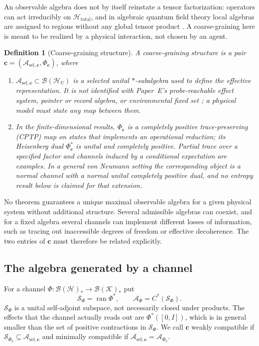 \documentclass[12pt,a4paper]{article}
\newtheorem{definition}[theorem]{Definition}
\begin{document}
An observable algebra does not by itself reinstate a tensor factorization: operators can act irreducibly on $\mathcal H_{\mathrm{total}}$, and in algebraic quantum field theory local algebras are assigned to regions without any global tensor product \cite{Haag1996}. A coarse-graining here is meant to be realized by a physical interaction, not chosen by an agent.

\begin{definition}[Coarse-graining structure]
\label{def:coarse}
A coarse-graining structure is a pair $\mathbf c=(\mathcal A_{\mathrm{sel},\mathbf c},\Phi_{\mathbf c})$, where
\begin{enumerate}
\item $\mathcal A_{\mathrm{sel},\mathbf c}\subset\mathcal B(\mathcal H_U)$ is a selected unital $*$-subalgebra used to define the effective representation. It is not identified with Paper~E's probe-reachable effect system, pointer or record algebra, or environmental fixed set \cite{Liu2026PaperE}; a physical model must state any map between them.
\item In the finite-dimensional results, $\Phi_{\mathbf c}$ is a completely positive trace-preserving (CPTP) map on states that implements an operational reduction; its Heisenberg dual $\Phi_{\mathbf c}^*$ is unital and completely positive. Partial trace over a specified factor and channels induced by a conditional expectation are examples. In a general von Neumann setting the corresponding object is a normal channel with a normal unital completely positive dual, and no entropy result below is claimed for that extension.
\end{enumerate}
\end{definition}

No theorem guarantees a unique maximal observable algebra for a given physical system without additional structure. Several admissible algebras can coexist, and for a fixed algebra several channels can implement different losses of information, such as tracing out inaccessible degrees of freedom or effective decoherence. The two entries of $\mathbf c$ must therefore be related explicitly.

\subsection{The algebra generated by a channel}

For a channel $\Phi:\mathcal B(\mathcal H)_*\to\mathcal B(\mathcal K)_*$ put
\[
\mathcal S_\Phi=\operatorname{ran}\Phi^*,\qquad
\mathcal A_\Phi=C^*(\mathcal S_\Phi).
\]
$\mathcal S_\Phi$ is a unital self-adjoint subspace, not necessarily closed under products. The effects that the channel actually reads out are $\Phi^*([0,I])$, which is in general smaller than the set of positive contractions in $\mathcal S_\Phi$. We call $\mathbf c$ weakly compatible if $\mathcal S_{\Phi_{\mathbf c}}\subseteq\mathcal A_{\mathrm{sel},\mathbf c}$ and minimally compatible if $\mathcal A_{\mathrm{sel},\mathbf c}=\mathcal A_{\Phi_{\mathbf c}}$.
\end{document}
